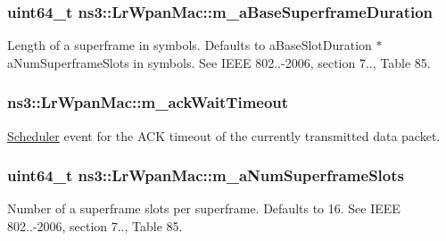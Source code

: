 \subsubsection[{\texorpdfstring{m\+\_\+a\+Base\+Superframe\+Duration}{m_aBaseSuperframeDuration}}]{\setlength{\rightskip}{0pt plus 5cm}uint64\+\_\+t ns3\+::\+Lr\+Wpan\+Mac\+::m\+\_\+a\+Base\+Superframe\+Duration}\hypertarget{classns3_1_1LrWpanMac_a29030c0084946fb37198fa07da3a2b03}{}\label{classns3_1_1LrWpanMac_a29030c0084946fb37198fa07da3a2b03}
Length of a superframe in symbols. Defaults to a\+Base\+Slot\+Duration $\ast$ a\+Num\+Superframe\+Slots in symbols. See I\+E\+EE 802..-\/2006, section 7.., Table 85. 
\subsubsection[{\texorpdfstring{m\+\_\+ack\+Wait\+Timeout}{m_ackWaitTimeout}}]{ ns3\+::\+Lr\+Wpan\+Mac\+::m\+\_\+ack\+Wait\+Timeout\hspace{0.3cm}{\ttfamily [private]}}\hypertarget{classns3_1_1LrWpanMac_aab5862bb53367634f12d0cddecc19fa8}{}\label{classns3_1_1LrWpanMac_aab5862bb53367634f12d0cddecc19fa8}
\hyperlink{classns3_1_1Scheduler}{Scheduler} event for the A\+CK timeout of the currently transmitted data packet. 
\subsubsection[{\texorpdfstring{m\+\_\+a\+Num\+Superframe\+Slots}{m_aNumSuperframeSlots}}]{\setlength{\rightskip}{0pt plus 5cm}uint64\+\_\+t ns3\+::\+Lr\+Wpan\+Mac\+::m\+\_\+a\+Num\+Superframe\+Slots}\hypertarget{classns3_1_1LrWpanMac_a605adeb44cababfd27a444c1f1314412}{}\label{classns3_1_1LrWpanMac_a605adeb44cababfd27a444c1f1314412}
Number of a superframe slots per superframe. Defaults to 16. See I\+E\+EE 802..-\/2006, section 7.., Table 85. 
